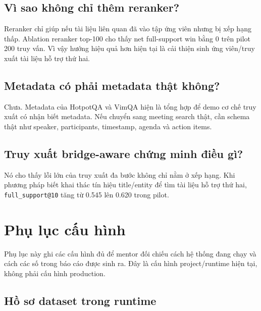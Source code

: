 \documentclass[11pt,a4paper]{article}
\newcommand{\metric}[1]{\texttt{#1}}
\begin{document}
\subsection*{Vì sao không chỉ thêm reranker?}

Reranker chỉ giúp nếu tài liệu liên quan đã vào tập ứng viên nhưng bị xếp hạng thấp. Ablation reranker
top-100 cho thấy net full-support win bằng 0 trên pilot 200 truy vấn. Vì vậy hướng hiệu quả hơn hiện tại
là cải thiện sinh ứng viên/truy xuất tài liệu hỗ trợ thứ hai.

\subsection*{Metadata có phải metadata thật không?}

Chưa. Metadata của HotpotQA và VimQA hiện là tổng hợp để demo cơ chế truy xuất có nhận biết metadata. Nếu chuyển
sang meeting search thật, cần schema thật như speaker, participants, timestamp, agenda và action items.

\subsection*{Truy xuất bridge-aware chứng minh điều gì?}

Nó cho thấy lỗi lớn của truy xuất đa bước không chỉ nằm ở xếp hạng. Khi phương pháp biết khai thác tín hiệu title/entity
để tìm tài liệu hỗ trợ thứ hai, \metric{full\_support@10} tăng từ 0.545 lên 0.620 trong pilot.

\appendix
\section{Phụ lục cấu hình}

Phụ lục này ghi các cấu hình đủ để mentor đối chiếu cách hệ thống đang chạy và cách các số trong báo cáo được sinh ra.
Đây là cấu hình project/runtime hiện tại, không phải cấu hình production.

\subsection{Hồ sơ dataset trong runtime}
\end{document}
